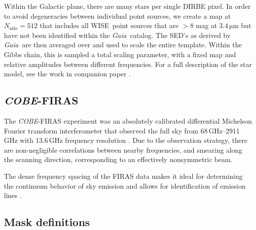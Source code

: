\documentclass{aa}
\def\COBE{\textit{COBE}}
\def\gaia{\textit{Gaia}}
\def\WISE{WISE}
\begin{document}
Within the Galactic plane, there are many stars per single DIRBE pixel. In order to avoid degeneracies between individual point sources, we create a map at $N_\mathrm{side}=512$ that includes all \WISE\ point sources that are $>8$ mag at $3.4\,\mathrm{\mu m}$ but have not been identified within the \gaia\ catalog. The SED's as derived by \gaia\ are then averaged over and used to scale the entire template. Within the Gibbs chain, this is sampled a total scaling parameter, with a fixed map and relative amplitudes between different frequencies. For a full description of the star model, see the work in companion paper \citet{CG02_04}.



\subsection{\COBE-FIRAS}

The \COBE-FIRAS experiment was an absolutely calibrated differential Michelson Fourier transform interferometer that observed the full sky from 68\,GHz--2911\,GHz with 13.6\,GHz frequency resolution \citep{fixsen:1994,mather:1999}. Due to the observation strategy, there are non-negligible correlations between nearby frequencies, and smearing along the scanning direction, corresponding to an effectively nonsymmetric beam.

The dense frequency spacing of the FIRAS data makes it ideal for determining the continuum behavior of sky emission and allows for identification of emission lines \citep{bennett:1994}.




\subsection{Mask definitions}
\end{document}
